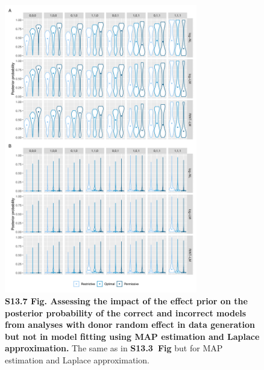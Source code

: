 \documentclass[11pt]{article}
\newcommand{\sfigppeffectthree}{\textbf{S13.3~Fig}\xspace}
\begin{document}
\begin{figure}[!ht]
\begin{center}
  \includegraphics[width=0.75\textwidth]{png/sim_vln_effect_map_lap_ranef_noranef.png}
\end{center}  
\caption{
  {\bf
    S13.7 Fig.
    Assessing the impact of the effect prior on the posterior probability of the correct and incorrect models from analyses with donor random effect in data generation but not in model fitting using MAP estimation and Laplace approximation.}
The same as in \sfigppeffectthree but for MAP estimation and Laplace approximation.
}
\label{s-fig:sim-effect-map-ranef-noranef}
\end{figure}
\end{document}
